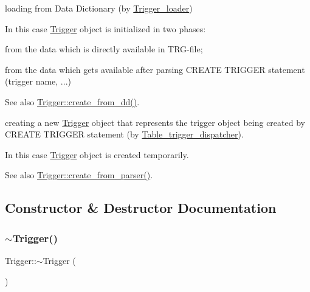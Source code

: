 \begin{DoxyEnumerate}
\item loading from Data Dictionary (by \mbox{\hyperlink{classTrigger__loader}{Trigger\+\_\+loader}})

In this case \mbox{\hyperlink{classTrigger}{Trigger}} object is initialized in two phases\+:
\begin{DoxyItemize}
\item from the data which is directly available in T\+RG-\/file;
\item from the data which gets available after parsing C\+R\+E\+A\+TE T\+R\+I\+G\+G\+ER statement (trigger name, ...)
\end{DoxyItemize}

\begin{DoxySeeAlso}{See also}
\mbox{\hyperlink{classTrigger_af25e592990988383f2df4f215b806ab3}{Trigger\+::create\+\_\+from\+\_\+dd()}}.
\end{DoxySeeAlso}

\item creating a new \mbox{\hyperlink{classTrigger}{Trigger}} object that represents the trigger object being created by C\+R\+E\+A\+TE T\+R\+I\+G\+G\+ER statement (by \mbox{\hyperlink{classTable__trigger__dispatcher}{Table\+\_\+trigger\+\_\+dispatcher}}).

In this case \mbox{\hyperlink{classTrigger}{Trigger}} object is created temporarily.

\begin{DoxySeeAlso}{See also}
\mbox{\hyperlink{classTrigger_afa4975456fa6b8bef6cd1c695c64e33e}{Trigger\+::create\+\_\+from\+\_\+parser()}}. 
\end{DoxySeeAlso}

\end{DoxyEnumerate}

\subsection{Constructor \& Destructor Documentation}
\mbox{\label{classTrigger_a1a2d107dd06737f51c81c4897c75e59d}} 
\subsubsection{\texorpdfstring{$\sim$\+Trigger()}{~Trigger()}}
{\footnotesize\ttfamily Trigger\+::$\sim$\+Trigger (\begin{DoxyParamCaption}{ }\end{DoxyParamCaption})}

